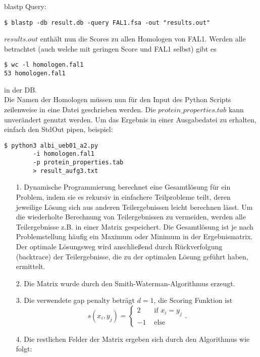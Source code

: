 \documentclass{homework}
\begin{document}
\begin{enumerate}
blastp Query:
\begin{verbatim}
$ blastp -db result.db -query FAL1.fsa -out "results.out"
\end{verbatim}

$results.out$ enthält nun die Scores zu allen Homologen von FAL1.
Werden alle betrachtet (auch welche mit geringen Score und FAL1 selbst) gibt es 
\begin{verbatim}
$ wc -l homologen.fal1 
53 homologen.fal1
\end{verbatim}
in der DB.\\
Die Namen der Homologen müssen nun für den Input des Python Scripts zeilenweise in eine Datei geschrieben werden.
Die $protein\_properties.tab$ kann unverändert genutzt werden.
Um das Ergebnis in einer Ausgabedatei zu erhalten, einfach den StdOut pipen, beispiel:

\begin{verbatim}
$ python3 albi_ueb01_a2.py 
		-i homologen.fal1 
		-p protein_properties.tab 
		> result_aufg3.txt
\end{verbatim}



\begin{enumerate}
\item[1.] Dynamische Programmierung berechnet eine Gesamtlösung für ein Problem,
indem sie es rekursiv in einfachere Teilprobleme teilt,
deren jeweilige Lösung sich aus anderen Teilergebnissen leicht berechnen lässt.
Um die wiederholte Berechnung von Teilergebnissen zu vermeiden, werden alle Teilergebnisse z.B. in einer Matrix gespeichert.
Die Gesamtlösung ist je nach Problemstellung häufig ein Maximum oder Minimum in der Ergebnismatrix.
Der optimale Lösungsweg wird anschließend durch Rückverfolgung (backtrace) der Teilergebnisse,
die zu der optimalen Lösung geführt haben, ermittelt.

\item[2.] Die Matrix wurde durch den Smith-Waterman-Algorithmus erzeugt.
\item[3.] Die verwendete gap penalty beträgt $d = 1$, die Scoring Funktion ist
$$s(x_i, y_j) = \begin{cases}
2	& \text{ if } x_i = y_j\\
-1	& \text{ else}
\end{cases}.$$

\item[4.] Die restlichen Felder der Matrix ergeben sich durch den Algorithmus wie folgt:


\end{enumerate}
\end{enumerate}
\end{document}
